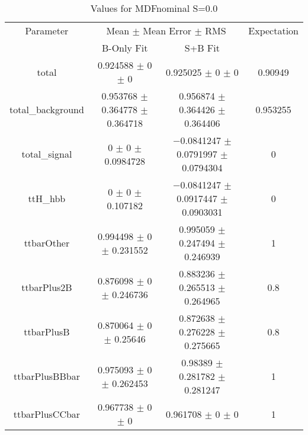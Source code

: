 \begin{table}
\centering
\caption{Values for MDFnominal S=0.0}
\begin{tabular}{cccc}
\toprule
Parameter & \multicolumn{2}{c}{Mean $\pm$ Mean Error $\pm$ RMS} & Expectation\\
 & B-Only Fit & S+B Fit & \\
\midrule
total & \num{0.924588} $\pm$ \num{0} $\pm$ \num{0} & \num{0.925025} $\pm$ \num{0} $\pm$ \num{0} & \num{0.90949}\\
total\_background & \num{0.953768} $\pm$ \num{0.364778} $\pm$ \num{0.364718} & \num{0.956874} $\pm$ \num{0.364426} $\pm$ \num{0.364406} & \num{0.953255}\\
total\_signal & \num{0} $\pm$ \num{0} $\pm$ \num{0.0984728} & \num{-0.0841247} $\pm$ \num{0.0791997} $\pm$ \num{0.0794304} & \num{0}\\
ttH\_hbb & \num{0} $\pm$ \num{0} $\pm$ \num{0.107182} & \num{-0.0841247} $\pm$ \num{0.0917447} $\pm$ \num{0.0903031} & \num{0}\\
ttbarOther & \num{0.994498} $\pm$ \num{0} $\pm$ \num{0.231552} & \num{0.995059} $\pm$ \num{0.247494} $\pm$ \num{0.246939} & \num{1}\\
ttbarPlus2B & \num{0.876098} $\pm$ \num{0} $\pm$ \num{0.246736} & \num{0.883236} $\pm$ \num{0.265513} $\pm$ \num{0.264965} & \num{0.8}\\
ttbarPlusB & \num{0.870064} $\pm$ \num{0} $\pm$ \num{0.25646} & \num{0.872638} $\pm$ \num{0.276228} $\pm$ \num{0.275665} & \num{0.8}\\
ttbarPlusBBbar & \num{0.975093} $\pm$ \num{0} $\pm$ \num{0.262453} & \num{0.98389} $\pm$ \num{0.281782} $\pm$ \num{0.281247} & \num{1}\\
ttbarPlusCCbar & \num{0.967738} $\pm$ \num{0} $\pm$ \num{0} & \num{0.961708} $\pm$ \num{0} $\pm$ \num{0} & \num{1}\\
\bottomrule
\end{tabular}
\end{table}
